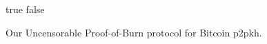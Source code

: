 \begin{figure}[t]
\begin{algorithm}[H]
    \caption{\label{alg.construction} Our Uncensorable Proof-of-Burn protocol for Bitcoin p2pkh.}
    \begin{algorithmic}[1]
            \State{}
        \EndFunction
                \State\Return\textsf{true}
            \Else
                \State\Return\textsf{false}
            \EndIf
        \EndFunction
        \vskip8pt
    \end{algorithmic}
\end{algorithm}
\end{figure}
